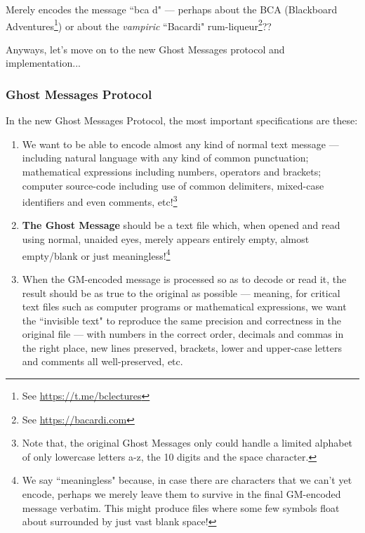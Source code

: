 \documentclass[a4paper, 18pt]{book} %
\begin{document}
{{{\begin{enumerate}
{Merely encodes the message ``bca d" --- perhaps about the BCA (Blackboard Adventures\footnote{See \url{https://t.me/bclectures}}) or about the \textit{vampiric} ``Bacardi" rum-liqueur\footnote{See \url{https://bacardi.com}}??

}
\end{enumerate}

\vspace{2em}


Anyways, let's move on to the new Ghost Messages protocol and implementation...

\subsubsection{Ghost Messages Protocol}

In the new Ghost Messages Protocol, the most important specifications are these:

\begin{enumerate}
\item We want to be able to encode almost any kind of normal text message --- including natural language with any kind of common punctuation; mathematical expressions including numbers, operators and brackets; computer source-code including use of common delimiters, mixed-case identifiers and even comments, etc!\footnote{Note that, the original Ghost Messages only could handle a limited alphabet of only lowercase letters a-z, the 10 digits and the space character.}
\item \textbf{The Ghost Message} should be a text file which, when opened and read using normal, unaided eyes, merely appears entirely empty, almost empty/blank or just meaningless!\footnote{We say ``meaningless" because, in case there are characters that we can't yet encode, perhaps we merely leave them to survive in the final GM-encoded message verbatim. This might produce files where some few symbols float about surrounded by just vast blank space!}
\item When the GM-encoded message is processed so as to decode or read it, the result should be as true to the original as possible --- meaning, for critical text files such as computer programs or mathematical expressions, we want the ``invisible text" to reproduce the same precision and correctness in the original file --- with numbers in the correct order, decimals and commas in the right place, new lines preserved, brackets, lower and upper-case letters and comments all well-preserved, etc.
\end{enumerate}

}}}
\end{document}
